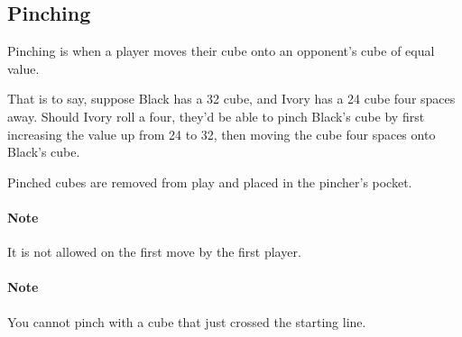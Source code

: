 \subsection{Pinching}
Pinching is when a player moves their cube onto an opponent's cube of equal value.

That is to say, suppose Black has a 32 cube, and Ivory has a 24 cube four spaces away. 
Should Ivory roll a four, they'd be able to pinch Black's cube by first increasing the value up from 24 to 32, then moving the cube four spaces onto Black's cube.

Pinched cubes are removed from play and placed in the pincher's pocket.

\paragraph{Note} It is not allowed on the first move by the first player.

\paragraph{Note} You cannot pinch with a cube that just crossed the starting line.